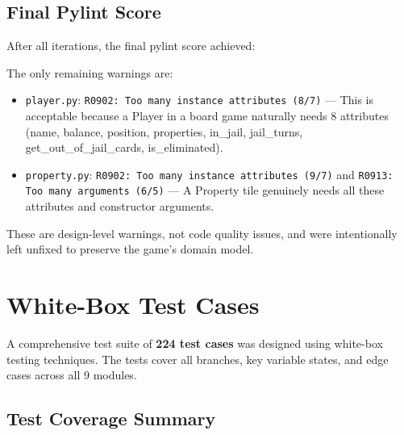 \documentclass[12pt,a4paper]{article}
\begin{document}
\subsection{Final Pylint Score}

After all iterations, the final pylint score achieved:

\begin{center}
\end{center}

The only remaining warnings are:
\begin{itemize}
  \item \texttt{player.py}: \texttt{R0902: Too many instance attributes (8/7)} --- This is acceptable because a Player in a board game naturally needs 8 attributes (name, balance, position, properties, in\_jail, jail\_turns, get\_out\_of\_jail\_cards, is\_eliminated).
  \item \texttt{property.py}: \texttt{R0902: Too many instance attributes (9/7)} and \texttt{R0913: Too many arguments (6/5)} --- A Property tile genuinely needs all these attributes and constructor arguments.
\end{itemize}

These are design-level warnings, not code quality issues, and were intentionally left unfixed to preserve the game's domain model.

\newpage
\section{White-Box Test Cases}

A comprehensive test suite of \textbf{224 test cases} was designed using white-box testing techniques. The tests cover all branches, key variable states, and edge cases across all 9 modules.

\subsection{Test Coverage Summary}
\end{document}
